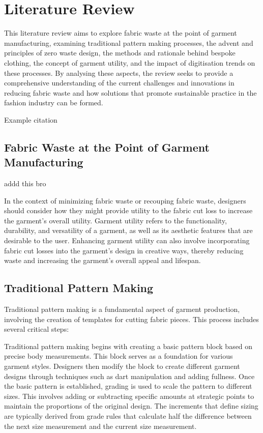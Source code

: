 \chapter{Literature Review}
This literature review aims to explore fabric waste at the point of garment manufacturing, examining traditional pattern making processes, the advent and principles of zero waste design, the methods and rationale behind bespoke clothing, the concept of garment utility, and the impact of digitisation trends on these processes. By analysing these aspects, the review seeks to provide a comprehensive understanding of the current challenges and innovations in reducing fabric waste and how solutions that promote sustainable practice in the fashion industry can be formed. 

Example citation \cite{aldrich_metric_2015}

\section{Fabric Waste at the Point of Garment Manufacturing}
addd this bro

In the context of minimizing fabric waste or recouping fabric waste, designers should consider how they might provide utility to the fabric cut loss to increase the garment’s overall utility. Garment utility refers to the functionality, durability, and versatility of a garment, as well as its aesthetic features that are desirable to the user. Enhancing garment utility can also involve incorporating fabric cut losses into the garment’s design in creative ways, thereby reducing waste and increasing the garment’s overall appeal and lifespan.


\section{Traditional Pattern Making}
Traditional pattern making is a fundamental aspect of garment production, involving the creation of templates for cutting fabric pieces. This process includes several critical steps:

Traditional pattern making begins with creating a basic pattern block based on precise body measurements. This block serves as a foundation for various garment styles. Designers then modify the block to create different garment designs through techniques such as dart manipulation and adding fullness. Once the basic pattern is established, grading is used to scale the pattern to different sizes. This involves adding or subtracting specific amounts at strategic points to maintain the proportions of the original design. The increments that define sizing are typically derived from grade rules that calculate half the difference between the next size measurement and the current size measurement.


